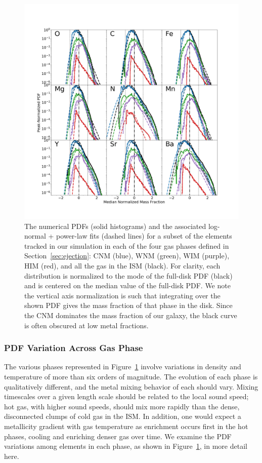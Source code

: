 \documentclass[twocolumn]{aastex61}
\begin{document}
\begin{figure}
\centering
\includegraphics[width=0.95\linewidth]{DD0390_element_by_element.png}
\caption{The numerical PDFs (solid histograms) and the associated log-normal + power-law fits (dashed lines) for a subset of the elements tracked in our simulation in each of the four gas phases defined in Section~\ref{sec:ejection}: CNM (blue), WNM (green), WIM (purple), HIM (red), and all the gas in the ISM (black). For clarity, each distribution is normalized to the mode of the full-disk PDF (black) and is centered on the median value of the full-disk PDF. We note the vertical axis normalization is such that integrating over the shown PDF gives the mass fraction of that phase in the disk. Since the CNM dominates the mass fraction of our galaxy, the black curve is often obscured at low metal fractions.}
\label{fig:log-normal}
\end{figure}

\subsubsection{PDF Variation Across Gas Phase}
\label{sec:phase-pdfs}

The various phases represented in Figure~\ref{fig:log-normal} involve variations in density and temperature of more than six orders of magnitude. The evolution of each phase is qualitatively different, and the metal mixing behavior of each should vary. Mixing timescales over a given length scale should be related to the local sound speed; hot gas, with higher sound speeds, should mix more rapidly than the dense, disconnected clumps of cold gas in the ISM. In addition, one would expect a metallicity gradient with gas temperature as enrichment occurs first in the hot phases, cooling and enriching denser gas over time. We examine the PDF variations among elements in each phase, as shown in Figure~\ref{fig:log-normal}, in more detail here.
\end{document}
